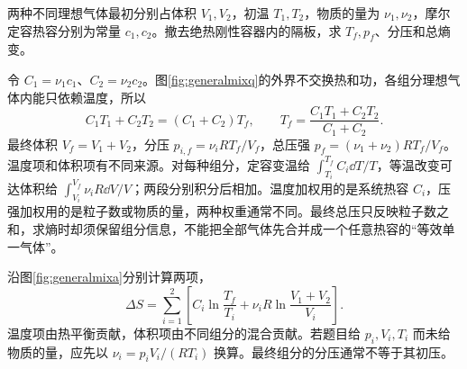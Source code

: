 \begin{example}\label{ex:generalmix}
两种不同理想气体最初分别占体积 $V_1,V_2$，初温 $T_1,T_2$，物质的量为 $\nu_1,\nu_2$，摩尔定容热容分别为常量 $c_1,c_2$。撤去绝热刚性容器内的隔板，求 $T_f,p_f$、分压和总熵变。
\end{example}
\begin{solution}
令 $C_1=\nu_1c_1$、$C_2=\nu_2c_2$。图\ref{fig:generalmixq}的外界不交换热和功，各组分理想气体内能只依赖温度，所以
\[
 C_1T_1+C_2T_2=(C_1+C_2)T_f,
 \qquad T_f=\frac{C_1T_1+C_2T_2}{C_1+C_2}.
\]
最终体积 $V_f=V_1+V_2$，分压 $p_{i,f}=\nu_iRT_f/V_f$，总压强 $p_f=(\nu_1+\nu_2)RT_f/V_f$。
温度项和体积项有不同来源。对每种组分，定容变温给 $\int_{T_i}^{T_f}C_i\dd T/T$，等温改变可达体积给 $\int_{V_i}^{V_f}\nu_iR\dd V/V$；两段分别积分后相加。温度加权用的是系统热容 $C_i$，压强加权用的是粒子数或物质的量，两种权重通常不同。最终总压只反映粒子数之和，求熵时却须保留组分信息，不能把全部气体先合并成一个任意热容的“等效单一气体”。

沿图\ref{fig:generalmixa}分别计算两项，
\[
 \Delta S=\sum_{i=1}^2\left[C_i\ln\frac{T_f}{T_i}
 +\nu_iR\ln\frac{V_1+V_2}{V_i}\right].
\]
温度项由热平衡贡献，体积项由不同组分的混合贡献。若题目给 $p_i,V_i,T_i$ 而未给物质的量，应先以 $\nu_i=p_iV_i/(RT_i)$ 换算。最终组分的分压通常不等于其初压。
\end{solution}

